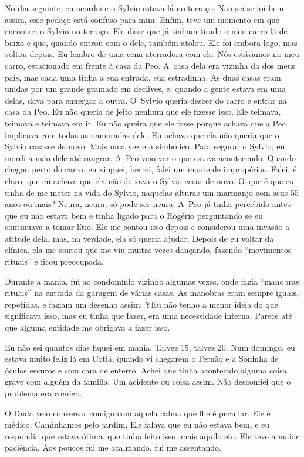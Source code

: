 No dia seguinte, eu acordei e o Sylvio estava lá no terraço. Não sei se
foi bem assim, esse pedaço está confuso para mim. Enfim, teve um momento
em que encontrei o Sylvio no terraço. Ele disse que já tinham tirado o
meu carro lá de baixo e que, quando entrou com o dele, também atolou.
Ele foi embora logo, mas voltou depois. Eu lembro de uma cena aterradora
com ele. Nós estávamos no meu carro, estacionado em frente à casa da
Peo. A~casa dela era vizinha da dos meus pais, mas cada uma tinha a sua
entrada, sua estradinha. As duas casas eram unidas por um grande gramado
em declives, e, quando a gente estava em uma delas, dava para enxergar a
outra. O~Sylvio queria descer do carro e entrar na casa da Peo. Eu não
queria de jeito nenhum que ele fizesse isso. Ele teimava, teimava e
teimava em ir. Eu não queira que ele fosse porque achava que a Peo
implicava com todas as namoradas dele. Eu achava que ela não queria que
o Sylvio casasse de novo. Mais uma vez era simbólico. Para segurar o
Sylvio, eu mordi a mão dele até sangrar. A~Peo veio ver o que estava
acontecendo. Quando chegou perto do carro, eu xinguei, berrei, falei um
monte de impropérios. Falei, é claro, que eu achava que ela não deixava
o Sylvio casar de novo. O~que é que eu tinha de me meter na vida do
Sylvio, naquelas alturas um marmanjo com seus 55 anos ou mais? Neura,
neura, só pode ser neura. A~Peo já tinha percebido antes que eu não
estava bem e tinha ligado para o Rogério perguntando se eu continuava a
tomar lítio. Ele me contou isso depois e considerou uma invasão a
atitude dela, mas, na verdade, ela só queria ajudar. Depois de eu voltar
da clínica, ela me contou que me viu muitas vezes dançando, fazendo
``movimentos rituais'' e ficou preocupada.

Durante a mania, fui ao condomínio vizinho algumas vezes, onde fazia
``manobras rituais'' na entrada da garagem de várias casas. As manobras
eram sempre iguais, repetidas, e faziam um desenho assim: Y\. Eu não
tenho a menor ideia do que significava isso, mas eu tinha que fazer, era
uma necessidade interna. Parece até que alguma entidade me obrigava a
fazer isso.

Eu não sei quantos dias fiquei em mania. Talvez 15, talvez 20. Num
domingo, eu estava muito feliz lá em Cotia, quando vi chegarem o Fernão
e a Soninha de óculos escuros e com cara de enterro. Achei que tinha
acontecido alguma coisa grave com alguém da família. Um acidente ou
coisa assim. Não desconfiei que o problema era comigo.

O Duda veio conversar comigo com aquela calma que lhe é peculiar. Ele é
médico. Caminhamos pelo jardim. Ele falava que eu não estava bem, e eu
respondia que estava ótima, que tinha feito isso, mais aquilo etc. Ele
teve a maior paciência. Aos poucos fui me acalmando, fui me assentando.

